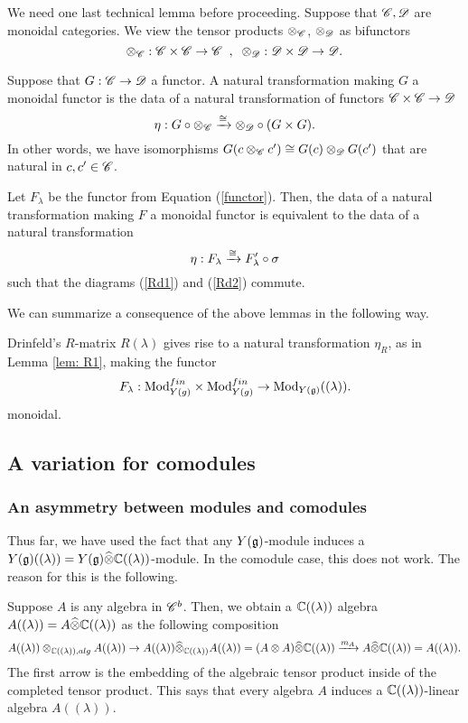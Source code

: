 \documentclass[11pt]{amsart}
\begin{document}
We need one last technical lemma before proceeding.
Suppose that $\mathscr C, \mathscr D$ are monoidal categories.
We view the tensor products $\otimes_{\mathscr C}$, $\otimes_{\mathscr D}$ as bifunctors
\[
\otimes_{\mathscr C} : \mathscr C \times \mathscr C \to \mathscr C \;\; , \;\; \otimes_{\mathscr D} : \mathscr D \times \mathscr D \to \mathscr D .
\]

Suppose that $G : \mathscr C \to \mathscr D$ a functor.
A natural transformation making $G$ a monoidal functor is the data of a natural transformation of functors $\mathscr C \times \mathscr C \to \mathscr D$
\[
\eta : G \circ \otimes_{\mathscr C} \xrightarrow{\cong} \otimes_{\mathscr D} \circ (G \times G) .
\]
In other words, we have isomorphisms $G(c \otimes_{\mathscr C} c') \cong G(c) \otimes_{\mathscr D} G(c')$ that are natural in $c,c' \in \mathscr C$. 

\begin{lem}\label{lem: monoidal1}
Let $F_\lambda$ be the functor from Equation (\ref{functor}).
Then, the data of a natural transformation making $F$ a monoidal functor is equivalent to the data of a natural transformation
\[
\eta : F_\lambda \xrightarrow{\cong} F'_\lambda \circ \sigma 
\]
such that the diagrams (\ref{Rd1}) and (\ref{Rd2}) commute. 
\end{lem}

We can summarize a consequence of the above lemmas in the following way. 

\begin{thm}\label{thm: fun1}
Drinfeld's $R$-matrix $R(\lambda)$ gives rise to a natural transformation $\eta_R$, as in Lemma \ref{lem: R1}, making the functor
\[
F_\lambda : {\rm Mod}_{Y(g)}^{fin} \times {\rm Mod}_{Y(g)}^{fin} \to {\rm Mod}_{Y(\mathfrak g)} ((\lambda)) .
\]
monoidal. 
\end{thm}

\subsection{A variation for comodules}

\subsubsection{An asymmetry between modules and comodules}
Thus far, we have used the fact that any $Y(\mathfrak g)$-module induces a $Y(\mathfrak g)((\lambda)) = Y(\mathfrak g) \widehat{\otimes} \mathbb C((\lambda))$-module. 
In the comodule case, this does not work. 
The reason for this is the following. 

Suppose $A$ is any algebra in $\mathscr C^b$. 
Then, we obtain a $\mathbb C((\lambda))$ algebra $A((\lambda)) = A \widehat{\otimes} \mathbb C((\lambda))$ as the following composition
\[
A((\lambda)) \otimes_{\mathbb C((\lambda)), alg} A((\lambda)) \to A((\lambda)) \widehat{\otimes}_{\mathbb C((\lambda))} A((\lambda)) = (A \otimes A) \widehat{\otimes} \mathbb C((\lambda)) \xrightarrow{m_A} A \widehat{\otimes} \mathbb C((\lambda)) = A((\lambda)) .
\] 
The first arrow is the embedding of the algebraic tensor product inside of the completed tensor product. 
This says that every algebra $A$ induces a $\mathbb C((\lambda))$-linear algebra $A((\lambda))$.
\end{document}
